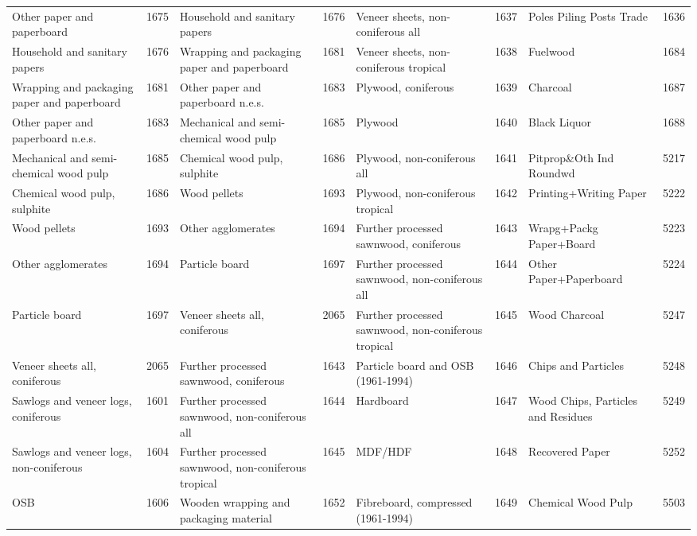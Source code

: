 \documentclass[
]{book}
\begin{document}
\begin{table}
\begin{tabular}[t]{lrlrlrlr}
\addlinespace
Other paper and paperboard & 1675 & Household and sanitary papers & 1676 & Veneer sheets, non-coniferous all & 1637 & Poles Piling Posts Trade & 1636\\
Household and sanitary papers & 1676 & Wrapping and packaging paper and paperboard & 1681 & Veneer sheets, non-coniferous tropical & 1638 & Fuelwood & 1684\\
Wrapping and packaging paper and paperboard & 1681 & Other paper and paperboard n.e.s. & 1683 & Plywood, coniferous & 1639 & Charcoal & 1687\\
Other paper and paperboard n.e.s. & 1683 & Mechanical and semi-chemical wood pulp & 1685 & Plywood & 1640 & Black Liquor & 1688\\
Mechanical and semi-chemical wood pulp & 1685 & Chemical wood pulp, sulphite & 1686 & Plywood, non-coniferous all & 1641 & Pitprop\&Oth Ind Roundwd & 5217\\
\addlinespace
Chemical wood pulp, sulphite & 1686 & Wood pellets & 1693 & Plywood, non-coniferous tropical & 1642 & Printing+Writing Paper & 5222\\
Wood pellets & 1693 & Other agglomerates & 1694 & Further processed sawnwood, coniferous & 1643 & Wrapg+Packg Paper+Board & 5223\\
Other agglomerates & 1694 & Particle board & 1697 & Further processed sawnwood, non-coniferous all & 1644 & Other Paper+Paperboard & 5224\\
Particle board & 1697 & Veneer sheets all, coniferous & 2065 & Further processed sawnwood, non-coniferous tropical & 1645 & Wood Charcoal & 5247\\
Veneer sheets all, coniferous & 2065 & Further processed sawnwood, coniferous & 1643 & Particle board and OSB (1961-1994) & 1646 & Chips and Particles & 5248\\
\addlinespace
Sawlogs and veneer logs, coniferous & 1601 & Further processed sawnwood, non-coniferous all & 1644 & Hardboard & 1647 & Wood Chips, Particles and Residues & 5249\\
Sawlogs and veneer logs, non-coniferous & 1604 & Further processed sawnwood, non-coniferous tropical & 1645 & MDF/HDF & 1648 & Recovered Paper & 5252\\
OSB & 1606 & Wooden wrapping and packaging material & 1652 & Fibreboard, compressed (1961-1994) & 1649 & Chemical Wood Pulp & 5503\\
\bottomrule
\end{tabular}
\end{table}
\end{document}
